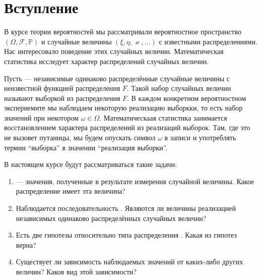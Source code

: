\chapter*{Вступление}

В курсе теории вероятностей мы рассматривали вероятностное пространство
$\left( \Omega, \mathcal{F}, \mathbb{P} \right)$ и случайные величины
$\left( \xi, \eta, \varkappa, \dots \right)$ с известными распределениями.
Нас интересовало поведение этих случайных величин.
Математическая статистика исследует характер распределений случайных величин.

Пусть \xsample --- независимые одинаково распределённые случайные величины с
неизвестной функцией распределения $F$.
Такой набор случайных величин называют выборкой из распределения $F$.
В каждом конкретном вероятностном экспериемнте мы наблюдаем некоторую
реализацию выборкки, то есть набор значений \xwsample при некотором
$\omega \in \Omega$.
Математическаая статистика занимается восстановлением характера распределений
из реализаций выборок.
Там, где это не вызовет путаницы, мы будем опускать символ $\omega$ в записи
\xwsample и употреблять термин ``выборка'' в значении ``реализация выборки''.

В настоящем курсе будут рассматриваться такие задачи:
\begin{enumerate}
  \item
    \xsample --- значения, полученные в результате измерения случайной
    величины.
    Какое распределение имеет эта величина?
  \item
    Наблюдается последовательность \xsample.
    Являются ли величины \xsample реализацией независимых
    одинаково распределённых случайных величин?
  \item
    Есть две гипотезы относительно типа распределения \xsample.
    Какая из гипотез верна?
  \item
    Существует ли зависимость наблюдаемых значений от каких-либо других величин?
    Каков вид этой зависимости?
\end{enumerate}
